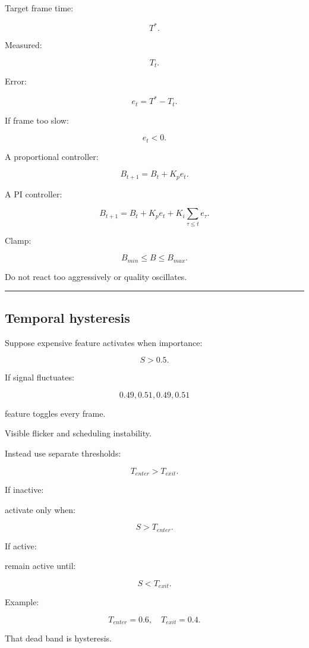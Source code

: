 Target frame time:

\[
T^*.
\]

Measured:

\[
T_t.
\]

Error:

\[
e_t=
T^*-T_t.
\]

If frame too slow:

\[
e_t<0.
\]

A proportional controller:

\[
B_{t+1}
=
B_t
+
K_p e_t.
\]

A PI controller:

\[
\boxed{
B_{t+1}
=
B_t
+
K_p e_t
+
K_i\sum_{\tau\le t}e_\tau.
}
\]

Clamp:

\[
B_{min}\le B\le B_{max}.
\]

Do not react too aggressively or quality oscillates.

\begin{center}\rule{0.5\linewidth}{0.5pt}\end{center}

\subsection{Temporal hysteresis}\label{04-visual-computing-ii-ch040-temporal-hysteresis}

\hypertarget{04-visual-computing-ii-ch040-temporal-hysteresis}{}

Suppose expensive feature activates when importance:

\[
S>0.5.
\]

If signal fluctuates:

\[
0.49,0.51,0.49,0.51
\]

feature toggles every frame.

Visible flicker and scheduling instability.

Instead use separate thresholds:

\[
\boxed{
T_{enter}>T_{exit}.
}
\]

If inactive:

activate only when:

\[
S>T_{enter}.
\]

If active:

remain active until:

\[
S<T_{exit}.
\]

Example:

\[
T_{enter}=0.6,
\quad
T_{exit}=0.4.
\]

That dead band is hysteresis.

